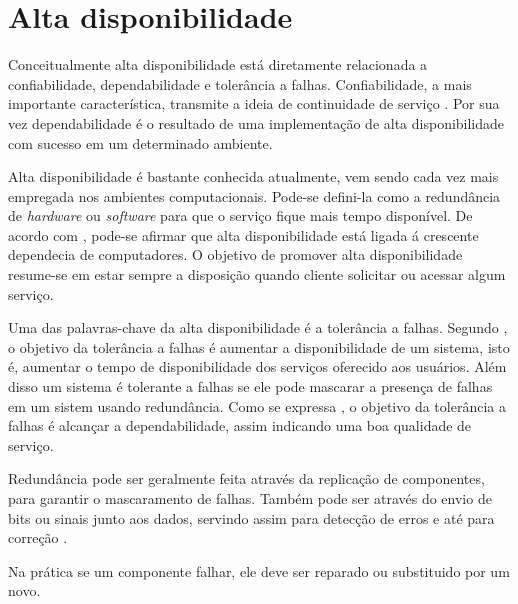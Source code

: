 \chapter{Alta disponibilidade}
Conceitualmente alta disponibilidade está diretamente relacionada a confiabilidade, dependabilidade e tolerância a falhas. 
Confiabilidade, a mais importante característica, transmite a ideia de continuidade de serviço \cite{pankaj1994}.
Por sua vez dependabilidade é o resultado de uma implementação de alta disponibilidade com sucesso em um determinado ambiente.

Alta disponibilidade é bastante conhecida atualmente, vem sendo cada vez mais empregada nos ambientes computacionais.
Pode-se defini-la como a redundância de \textit{hardware} ou \textit{software} para que o serviço fique mais tempo disponível.
De acordo com \cite{costa2009}, pode-se afirmar que alta disponibilidade está ligada á crescente dependecia de computadores.
O objetivo de promover alta disponibilidade resume-se em estar sempre a disposição quando cliente solicitar ou acessar algum serviço.

Uma das palavras-chave da alta disponibilidade é a tolerância a falhas.
Segundo \cite{pankaj1994}, o objetivo da tolerância a falhas é aumentar a disponibilidade de um sistema, isto é, 
aumentar o tempo de disponibilidade dos serviços oferecido aos usuários. Além disso um sistema é tolerante a falhas se ele pode
mascarar a presença de falhas em um sistem usando redundância. Como se expressa \cite{costa2009}, o objetivo da tolerância a falhas é 
alcançar a dependabilidade, assim indicando uma boa qualidade de serviço.

Redundância pode ser geralmente feita através da replicação de componentes, para garantir o mascaramento de falhas. 
Também pode ser através do envio de bits ou sinais junto aos dados, servindo assim para detecção de erros e até para correção \cite{weber2002}.

Na prática se um componente falhar, ele deve ser reparado ou substituido por um novo.

